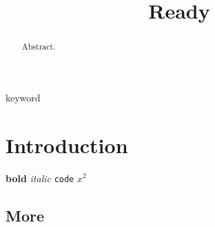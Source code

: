 \documentclass[conference]{IEEEtran}
\begin{document}
\title{Ready}\author{}\maketitle
\begin{abstract}Abstract.\end{abstract}
\begin{IEEEkeywords}keyword\end{IEEEkeywords}
\section{Introduction} \textbf{bold} \textit{italic} \texttt{code} $x^2$ \cite{knuth}
\subsection{More}

\end{document}
